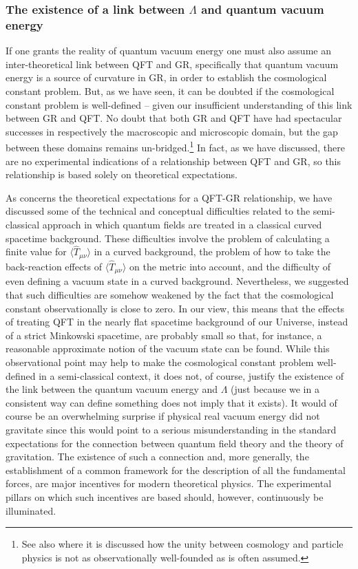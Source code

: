 \documentclass[12pt]{article}
\def\sss{\subsubsection}
\begin{document}
\sss{The existence of a link between $\Lambda$ and quantum vacuum energy}

\noindent
If one grants the reality of quantum vacuum energy one must also
assume an inter-theoretical link between QFT and GR, specifically
that quantum vacuum energy is a source of curvature in GR, in order
to establish the cosmological constant problem.  But, as we have seen,
it can be doubted if the cosmological constant problem is well-defined
-- given our insufficient understanding of this link between GR and
QFT. No doubt that both GR and QFT have had spectacular successes in
respectively the macroscopic and microscopic domain, but the gap
between these domains remains un-bridged.\footnote{See also
\cite{zinkernagel99} where it is discussed how the unity between
cosmology and particle physics is not as observationally well-founded
as is often assumed.}  In fact, as we have discussed, there are no
experimental indications of a relationship between QFT and GR, so this
relationship is based solely on theoretical expectations.

As concerns the theoretical expectations for a QFT-GR
relationship, we have discussed some of the technical and
conceptual difficulties related to the semi-classical approach in
which quantum fields are treated in a classical curved spacetime
background. These difficulties involve the problem of calculating
a finite value for $\langle \hat{T}_{\mu \nu} \rangle $ in a curved background,
the problem of how to take the back-reaction effects of
$\langle \hat{T}_{\mu \nu} \rangle $ on the metric into account, and the
difficulty of even defining a vacuum state in a curved background.
Nevertheless, we suggested that such difficulties are somehow
weakened by the fact that the cosmological constant
observationally is close to zero. In our view, this means that the
effects of treating QFT in the nearly flat spacetime background of
our Universe, instead of a strict Minkowski spacetime, are
probably small so that, for instance, a reasonable approximate
notion of the vacuum state can be found. While this observational
point may help to make the cosmological constant problem
well-defined in a semi-classical context, it does not, of course,
justify the existence of the link between the quantum vacuum
energy and $\Lambda$ (just because we in a consistent way can
define something does not imply that it exists). 
It would of course be an overwhelming surprise if physical
real vacuum energy did not gravitate since this would point to 
a serious misunderstanding in the standard expectations for
the connection between quantum field theory and the theory
of gravitation. The existence of such a connection and, more
generally, the establishment of a common framework for the 
description of all the fundamental forces, are major incentives
for modern theoretical physics. The experimental pillars on which
such incentives are based should, however, continuously be
illuminated.
\end{document}

